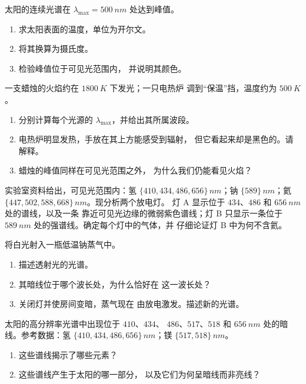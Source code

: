 \begin{exercise}[$\star\star$]\label{exo:g10:light-spectra:6}
太阳的连续光谱在 $\lambda_{\max} = \qty{500}{nm}$ 处达到峰值。
\begin{enumerate}
  \item 求太阳表面的温度，单位为开尔文。
  \item 将其换算为摄氏度。
  \item 检验峰值位于可见光范围内，
        并说明其颜色。
\end{enumerate}
\end{exercise}

\begin{exercise}[$\star\star$]\label{exo:g10:light-spectra:7}
一支蜡烛的火焰约在 $\qty{1800}{K}$ 下发光；一只电热炉
调到“保温”挡，温度约为 $\qty{500}{K}$。
\begin{enumerate}
  \item 分别计算每个光源的 $\lambda_{\max}$，并给出其所属波段。
  \item 电热炉明显发热，手放在其上方能感受到辐射，
        但它看起来却是黑色的。请解释。
  \item 蜡烛的峰值同样在可见光范围之外，
        为什么我们仍能看见火焰？
\end{enumerate}
\end{exercise}

\begin{exercise}[$\star\star$]\label{exo:g10:light-spectra:8}
实验室资料给出，可见光范围内：氢
$\{410, 434, 486, 656\}\,\unit{nm}$；钠 $\{589\}\,\unit{nm}$；氦
$\{447, 502, 588, 668\}\,\unit{nm}$。现分析两个放电灯。
灯 A 显示位于 $434$、$486$ 和 $\qty{656}{nm}$ 处的谱线，以及一条
靠近可见光边缘的微弱紫色谱线；灯 B 只显示一条位于
$\qty{589}{nm}$ 处的强谱线。确定每个灯中的气体，并
仔细论证灯 B 中为何不含氦。
\end{exercise}

\begin{exercise}[$\star\star$]\label{exo:g10:light-spectra:9}
将白光射入一瓶低温钠蒸气中。
\begin{enumerate}
  \item 描述透射光的光谱。
  \item 其暗线位于哪个波长处，为什么恰好在
        这一波长处？
  \item 关闭灯并使房间变暗，蒸气现在
        由放电激发。描述新的光谱。
\end{enumerate}
\end{exercise}

\begin{exercise}[$\star\star$]\label{exo:g10:light-spectra:10}
太阳的高分辨率光谱中出现位于 $410$、$434$、
$486$、$517$、$518$ 和 $\qty{656}{nm}$ 处的暗线。参考数据：氢
$\{410, 434, 486, 656\}\,\unit{nm}$；镁 $\{517, 518\}\,\unit{nm}$。
\begin{enumerate}
  \item 这些谱线揭示了哪些元素？
  \item 这些谱线产生于太阳的哪一部分，
        以及它们为何呈暗线而非亮线？
\end{enumerate}
\end{exercise}

